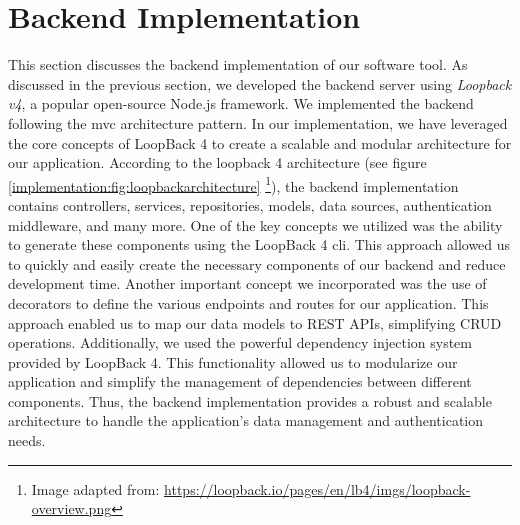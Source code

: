 \section{Backend Implementation}
\label{implementation:section:backend}
This section discusses the backend implementation of our software tool. 
As discussed in the previous section, we developed the backend server using \textit{Loopback v4}, a popular open-source Node.js framework.
We implemented the backend following the \ac{mvc} architecture pattern. 
In our implementation, we have leveraged the core concepts of LoopBack 4 to create a scalable and modular architecture for our application.
According to the loopback 4 architecture (see figure \ref{implementation:fig:loopbackarchitecture} \footnote{Image adapted from: \url{https://loopback.io/pages/en/lb4/imgs/loopback-overview.png}}), the backend implementation contains controllers, services, repositories, models, data sources, authentication middleware, and many more.
One of the key concepts we utilized was the ability to generate these components using the LoopBack 4 \ac{cli}.
This approach allowed us to quickly and easily create the necessary components of our backend and reduce development time.
Another important concept we incorporated was the use of decorators to define the various endpoints and routes for our application. 
This approach enabled us to map our data models to REST APIs, simplifying CRUD operations.
Additionally, we used the powerful dependency injection system provided by LoopBack 4. 
This functionality allowed us to modularize our application and simplify the management of dependencies between different components.
Thus, the backend implementation provides a robust and scalable architecture to handle the application's data management and authentication needs.
